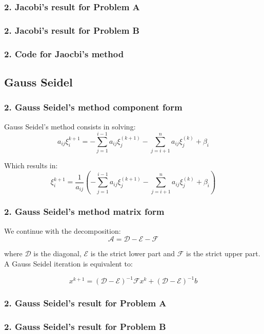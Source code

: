 \begin{frame}
\frametitle{\textbf{2. Jacobi's result for Problem A}}
\end{frame}

\begin{frame}
\frametitle{\textbf{2. Jacobi's result for Problem B}}
\end{frame}

\begin{frame}
	\frametitle{\textbf{2. Code for Jaocbi's method}}
\end{frame}

\subsection{Gauss Seidel}
\begin{frame} 
	\frametitle{\textbf{2. Gauss Seidel's method component form}}
	
	Gauss Seidel's method consists in solving:
	\[
	a_{ij} \xi_i^{k+1} = - \sum_{j=1}^{i-1} a_{ij} \xi_j^{(k+1)} - \sum_{j=i+1}^n a_{ij} \xi_j^{(k)} + \beta_i
	\]
	
Which results in:
\[
\xi_i^{k+1} = \frac{1}{a_{ij}} \left( - \sum_{j=1}^{i-1} a_{ij} \xi_j^{(k+1)} - \sum_{j=i+1}^n a_{ij} \xi_j^{(k)} + \beta_i \right)
\]
	
\end{frame}

\begin{frame} 
	\frametitle{\textbf{2. Gauss Seidel's method matrix form}}
	
	We continue with the decomposition:
	\[
	\mathcal{A} = \mathcal{D} - \mathcal{E}-\mathcal{F}
	\]
	
	where $\mathcal{D}$ is the diagonal, $\mathcal{E}$ is the strict lower part and $\mathcal{F}$ is the strict upper part. A Gauss Seidel iteration is equivalent to:
	
	\[
	x^{k+1} = \left(\mathcal{D}-\mathcal{E}\right)^{-1}\mathcal{F}x^{k} +  \left(\mathcal{D}-\mathcal{E}\right)^{-1} b
	\]
	
\end{frame}

\begin{frame}
	\frametitle{\textbf{2. Gauss Seidel's result for Problem A}}
\end{frame}

\begin{frame}
	\frametitle{\textbf{2. Gauss Seidel's result for Problem B}}
\end{frame}

